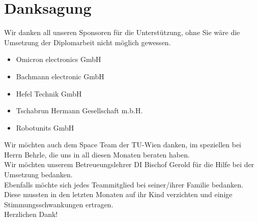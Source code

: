 \section{Danksagung}
Wir danken all unseren Sponsoren für die Unterstützung, ohne Sie wäre die Umsetzung der Diplomarbeit nicht möglich gewessen. \\
\begin{itemize}
	\item Omicron electronics GmbH\autocite{OMICRON_electronics_GmbH}
	\item Bachmann electronic GmbH\autocite{Bachmann_electronic_GmbH}
	\item Hefel Technik GmbH \autocite{Hefel_Technik_GmbH}
	\item Tschabrun Hermann Gesellschaft m.b.H.\autocite{Tschabrun_Hermann_Gesellschaft}
	\item Robotunits GmbH \autocite{robogmbh} 
\end{itemize}
Wir möchten auch dem Space Team\autocite{TU_Wien_Spaceteam} der TU-Wien danken, im speziellen bei Herrn Behrle, die uns in all diesen Monaten beraten haben.\\
\vspace{3mm}
Wir möchten unserem Betreueungslehrer DI Bischof Gerold für die Hilfe bei der Umsetzung bedanken.\\
\vspace{3mm}
Ebenfalls möchte sich jedes Teammitglied bei seiner/ihrer Familie bedanken. Diese mussten in den letzten Monaten auf ihr Kind verzichten und einige Stimmungsschwankungen ertragen.\\ 
\vspace{20mm}
Herzlichen Dank!